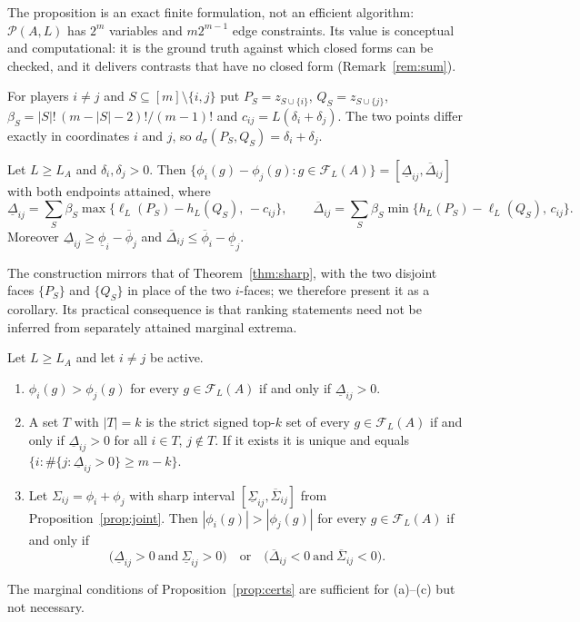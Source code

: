 The proposition is an exact finite formulation, not an efficient algorithm: $\mathcal P(A,L)$ has $2^m$ variables
and $m2^{m-1}$ edge constraints. Its value is conceptual and computational: it is the ground truth against which
closed forms can be checked, and it delivers contrasts that have no closed form (Remark~\ref{rem:sum}).

For players $i\neq j$ and $S\subseteq[m]\setminus\{i,j\}$ put $P_S=z_{S\cup\{i\}}$, $Q_S=z_{S\cup\{j\}}$,
$\beta_S=|S|!\,(m-|S|-2)!/(m-1)!$ and $c_{ij}=L(\delta_i+\delta_j)$. The two points differ exactly in coordinates
$i$ and $j$, so $d_\sigma(P_S,Q_S)=\delta_i+\delta_j$.

\begin{corollary}\label{cor:pair}
Let $L\ge L_A$ and $\delta_i,\delta_j>0$. Then $\{\phi_i(g)-\phi_j(g):g\in\mathcal F_L(A)\}=[\underline\Delta_{ij},\overline\Delta_{ij}]$
with both endpoints attained, where
\begin{equation}\label{eq:pair}
\underline\Delta_{ij}=\sum_{S}\beta_S\max\{\ell_L(P_S)-h_L(Q_S),\,-c_{ij}\},\qquad
\overline\Delta_{ij}=\sum_{S}\beta_S\min\{h_L(P_S)-\ell_L(Q_S),\,c_{ij}\}.
\end{equation}
Moreover $\underline\Delta_{ij}\ge\underline\phi_i-\overline\phi_j$ and $\overline\Delta_{ij}\le\overline\phi_i-\underline\phi_j$.
\end{corollary}

The construction mirrors that of Theorem~\ref{thm:sharp}, with the two disjoint faces $\{P_S\}$ and $\{Q_S\}$ in place of
the two $i$-faces; we therefore present it as a corollary. Its practical consequence is that ranking statements need not
be inferred from separately attained marginal extrema.

\begin{proposition}\label{prop:rank}
Let $L\ge L_A$ and let $i\neq j$ be active.
\begin{enumerate}
\item[(a)] $\phi_i(g)>\phi_j(g)$ for every $g\in\mathcal F_L(A)$ if and only if $\underline\Delta_{ij}>0$.
\item[(b)] A set $T$ with $|T|=k$ is the strict signed top-$k$ set of every $g\in\mathcal F_L(A)$ if and only if
      $\underline\Delta_{ij}>0$ for all $i\in T$, $j\notin T$. If it exists it is unique and equals
      $\{i:\#\{j:\underline\Delta_{ij}>0\}\ge m-k\}$.
\item[(c)] Let $\Sigma_{ij}=\phi_i+\phi_j$ with sharp interval $[\underline\Sigma_{ij},\overline\Sigma_{ij}]$ from
      Proposition~\ref{prop:joint}. Then $|\phi_i(g)|>|\phi_j(g)|$ for every $g\in\mathcal F_L(A)$ if and only if
      \[
      \bigl(\underline\Delta_{ij}>0\ \text{and}\ \underline\Sigma_{ij}>0\bigr)\quad\text{or}\quad
      \bigl(\overline\Delta_{ij}<0\ \text{and}\ \overline\Sigma_{ij}<0\bigr).
      \]
\end{enumerate}
The marginal conditions of Proposition~\ref{prop:certs} are sufficient for (a)--(c) but not necessary.
\end{proposition}

